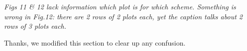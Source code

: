 \documentclass[10pt,a4paper]{article}
\begin{document}
\textit{Figs 11 \& 12 lack information which plot is for which scheme. Something is wrong in Fig.12: there are 2 rows of 2 plots each, yet the caption
talks about 2 rows of 3 plots each.}

Thanks, we modified this section to clear up any confusion.
\\[3pt]


\end{document}
